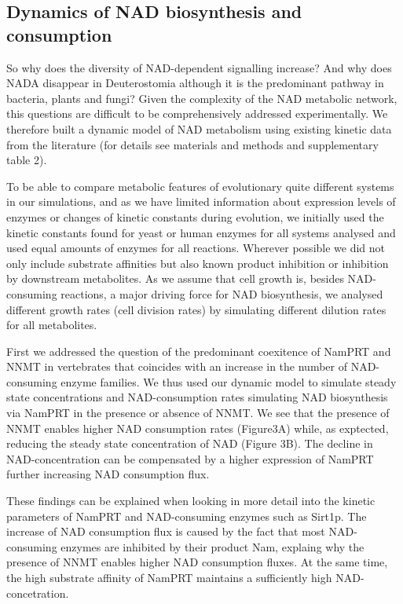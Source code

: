 \subsection{Dynamics of NAD biosynthesis and consumption}

So why does the diversity of NAD-dependent signalling increase? And why does NADA disappear in Deuterostomia although it is the predominant pathway in bacteria, plants and fungi? Given the complexity of the NAD metabolic network, this questions are difficult to be comprehensively addressed experimentally. We therefore built a dynamic model of NAD metabolism using existing kinetic data from the literature (for details see materials and methods and supplementary table 2).

To be able to compare metabolic features of evolutionary quite different systems in our simulations, and as we have limited information about expression levels of enzymes or changes of kinetic constants during evolution, we initially used the kinetic constants found for yeast or human enzymes for all systems analysed and used equal amounts of enzymes for all reactions. Wherever possible we did not only include substrate affinities but also known product inhibition or inhibition by downstream metabolites. As we assume that cell growth is, besides NAD-consuming reactions, a major driving force for NAD biosynthesis, we analysed different growth rates (cell division rates) by simulating different dilution rates for all metabolites.

First we addressed the question of the predominant coexitence of NamPRT and NNMT in vertebrates that coincides with an increase in the number of NAD-consuming enzyme families. We thus used our dynamic model to simulate steady state concentrations and NAD-consumption rates simulating NAD biosynthesis via  NamPRT in the  presence or absence of NNMT.  We see that the presence of NNMT enables higher NAD consumption rates  (Figure3A) while, as exptected, reducing the steady state concentration of NAD (Figure 3B). The decline in NAD-concentration can be compensated by a higher expression of NamPRT further increasing NAD consumption flux.

These findings can be explained when looking in more detail into the kinetic parameters of NamPRT and NAD-consuming enzymes such as Sirt1p.  The increase of NAD consumption flux is caused by the fact that most NAD-consuming enzymes are inhibited by their product Nam, explaing why the presence of NNMT enables higher NAD consumption fluxes. At the same time, the high substrate affinity of NamPRT maintains a sufficiently high NAD-concetration.


